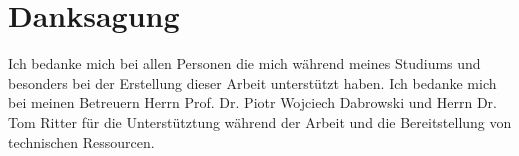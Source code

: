 \chapter*{Danksagung}
Ich bedanke mich bei allen Personen die mich während meines Studiums und besonders bei
der Erstellung dieser Arbeit unterstützt haben. Ich bedanke mich bei meinen Betreuern
Herrn Prof. Dr. Piotr Wojciech Dabrowski und Herrn Dr. Tom Ritter für die Unterstütztung
während der Arbeit und die Bereitstellung von technischen Ressourcen.
